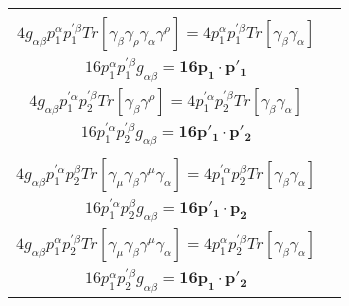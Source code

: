 \documentclass[a4]{article}
\begin{document}
    \begin{center}
        \begin{tabular}{| c | c |}
            \hline
            \shortstack{$T_2 = Tr [\gamma_\mu \slashed{p}_1 \gamma_rho \slashed{p'}_1 \gamma^\mu \gamma^rho] = p_1^{\alpha} p_1^{'\beta} Tr [\gamma_\mu \gamma_\mu \gamma_\rho \gamma_\beta \gamma^\mu \gamma^\rho]$ \\ $ 4 g_{\alpha \beta} p_1^{\alpha} p_1^{'\beta} Tr [\gamma_\beta \gamma_\rho \gamma_\alpha \gamma^\rho] = 4 p_1^{\alpha} p_1^{'\beta} Tr [\gamma_\beta \gamma_\alpha]$ \\ $16 p_1^{\alpha} p_1^{'\beta} g_{\alpha \beta} = \mathbf{16 p_1 \cdot p'_1}$} & \shortstack{$T_3 = Tr [\gamma_\mu \gamma_\rho \slashed{p'}_1 \gamma^\mu \gamma^\rho \slashed{p'}_2] = p_1^{'\alpha} p_2^{'\beta} Tr [\gamma_\mu \gamma_\rho \gamma_\alpha \gamma^\mu \gamma^\rho \gamma_\beta]$ \\ $ 4 g_{\alpha \beta} p_1^{'\alpha} p_2^{'\beta} Tr [\gamma_\beta \gamma^\rho] = 4 p_1^{'\alpha} p_2^{'\beta} Tr [\gamma_\beta \gamma_\alpha]$ \\ $16 p_1^{'\alpha} p_2^{'\beta} g_{\alpha \beta} = \mathbf{16 p'_1 \cdot p'_2}$} \\
            \hline
            \shortstack{$T_4 = Tr [\gamma_\mu \gamma_\rho \slashed{p'}_1 \gamma^\mu \slashed{p}_2 \gamma^\rho] = p_1^{'\alpha} p_2^{\beta} Tr [\gamma_\mu \gamma_rho \gamma_\alpha \gamma^\mu \gamma_\beta \gamma^\rho]$ \\ $ 4 g_{\alpha \beta} p_1^{'\alpha} p_2^{\beta} Tr [\gamma_\mu \gamma_\beta \gamma^\mu \gamma_\alpha] = 4 p_1^{'\alpha} p_2^{\beta} Tr [\gamma_\beta \gamma_\alpha]$ \\ $16 p_1^{'\alpha} p_2^{\beta} g_{\alpha \beta} = \mathbf{16 p'_1 \cdot p_2}$} & \shortstack{$T_5 = Tr [\gamma_\mu \slashed{p}_1 \gamma_\rho \gamma^\mu \gamma^\rho \slashed{p'}_2] = p_1^{\alpha} p_2^{'\beta} Tr [\gamma_\mu \gamma_\alpha \gamma_\rho \gamma^\mu \gamma^\rho \gamma_\beta]$ \\ $ 4 g_{\alpha \beta} p_1^{\alpha} p_2^{'\beta} Tr [\gamma_\mu \gamma_\beta \gamma^\mu \gamma_\alpha] = 4 p_1^{\alpha} p_2^{'\beta} Tr [\gamma_\beta \gamma_\alpha]$ \\ $16 p_1^{\alpha} p_2^{'\beta} g_{\alpha \beta} = \mathbf{16 p_1 \cdot p'_2}$} \\
            \hline

\end{tabular}
\end{center}
\end{document}

